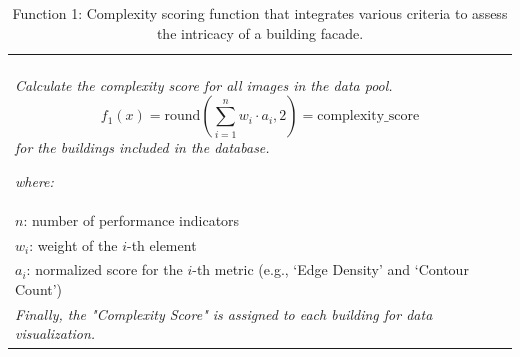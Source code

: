 \documentclass[final,5p,times]{elsarticle}
\begin{document}
    \begin{table}[htb]
        \caption{Function 1: Complexity scoring function that integrates various criteria to assess the intricacy of a building facade.}
        \label{tab:ComplexityScoreFunction}
        \begin{tabularx}{\linewidth}{|X|}
            \hline
            \small
            \vspace{-0.1cm}
            \multicolumn{1}{c}{\textbf{\(f_1\): Unified Complexity Scoring Function}}\\
            \textit{Calculate the complexity score for all images in the data pool.}
            \begin{equation}
                f_1(x) = \mathrm{round}\left(\sum_{i=1}^{n} w_i \cdot a_i, 2\right) = \text{complexity\_score}
                \label{eq:F1_ComplexityScoreFunction}
            \end{equation}
            \textit{for the buildings included in the database.}
            \vspace{0.5em}

            \textit{where:}\\
            \(n\): number of performance indicators\\
            \(w_i\): weight of the \(i\)-th element\\
            \(a_i\): normalized score for the \(i\)-th metric (e.g., `Edge Density' and `Contour Count')\\
            \vspace{0.05em}
            \textit{Finally, the "Complexity Score" is assigned to each building for data visualization.}
            \vspace{0.5em}\\
            \hline
        \end{tabularx}
    \end{table}
\end{document}
